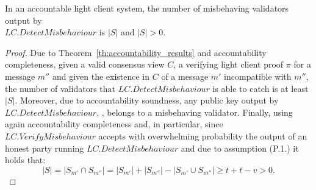 \begin{corollary} In an accountable light client system, the number of misbehaving validators output by \\ 
$\mathit{LC.DetectMisbehaviour}$ is $|S|$ and $|S| > 0$.
\end{corollary}
\begin{proof} Due to Theorem~\ref{th:accountability_results} and accountability completeness, 
given a valid consensus view $C$, a verifying light client proof $\pi$ for a message $m''$ 
and given the existence in $C$ of a message $m'$ incompatible with $m''$, the number of 
validators that $\mathit{LC.DetectMisbehaviour}$ is able to catch is at least $|S|$. Moreover, due 
to accountability soundness, any public key output by $\mathit{LC.DetectMisbehaviour}$, \ewnp, belongs to a misbehaving validator. 
Finally, using again accountability completeness and, in particular, since $\mathit{LC.VerifyMisbehaviour}$ accepts 
with overwhelming probability the output of an honest party running $\mathit{LC.DetectMisbehaviour}$ and due to assumption (P.1.) it holds that:
$$ |S| = |S_{m'} \cap S_{m''}| = |S_{m'}| + |S_{m''}| - |S_{m'} \cup S_{m''}| \geq t + t - v > 0.$$ 
\end{proof}
